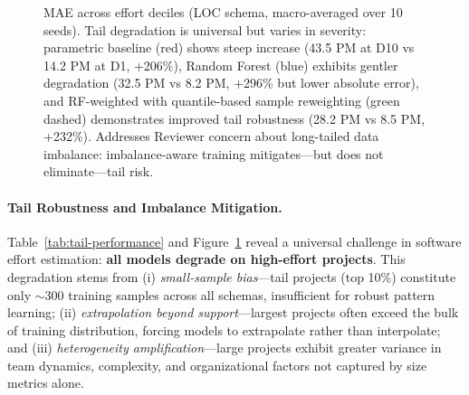 \documentclass{ieeeaccess}
\begin{document}
\begin{figure}[h]
\centering
{}
\caption{MAE across effort deciles (LOC schema, macro-averaged over 10 seeds). Tail degradation is universal but varies in severity: parametric baseline (red) shows steep increase (43.5 PM at D10 vs 14.2 PM at D1, +206\%), Random Forest (blue) exhibits gentler degradation (32.5 PM vs 8.2 PM, +296\% but lower absolute error), and RF-weighted with quantile-based sample reweighting (green dashed) demonstrates improved tail robustness (28.2 PM vs 8.5 PM, +232\%). Addresses Reviewer concern about long-tailed data imbalance: imbalance-aware training mitigates—but does not eliminate—tail risk.}
\label{fig:mae-deciles}
\end{figure}

\paragraph{Tail Robustness and Imbalance Mitigation.}
Table~\ref{tab:tail-performance} and Figure~\ref{fig:mae-deciles} reveal a universal challenge in software effort estimation: \textbf{all models degrade on high-effort projects}. This degradation stems from (i) \textit{small-sample bias}—tail projects (top 10\%) constitute only $\sim$300 training samples across all schemas, insufficient for robust pattern learning; (ii) \textit{extrapolation beyond support}—largest projects often exceed the bulk of training distribution, forcing models to extrapolate rather than interpolate; and (iii) \textit{heterogeneity amplification}—large projects exhibit greater variance in team dynamics, complexity, and organizational factors not captured by size metrics alone.
\end{document}
